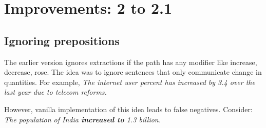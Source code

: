 \documentclass[a4paper,10pt]{article}
\title{}
\author{}
\begin{document}
\maketitle

\begin{abstract}

\end{abstract}

\section{Improvements: 2 to 2.1}
\subsection{Ignoring prepositions}
The earlier version ignores extractions if the path has any modifier like increase, decrease, rose.
The idea was to ignore sentences that only communicate change in quantities. For example, 
\emph{The internet user percent has increased by 3.4 over the last year due to telecom reforms.}

However, vanilla implementation of this idea leads to false negatives. Consider:
\emph{The population of India \textbf{increased to} 1.3 billion.}
\end{document}
